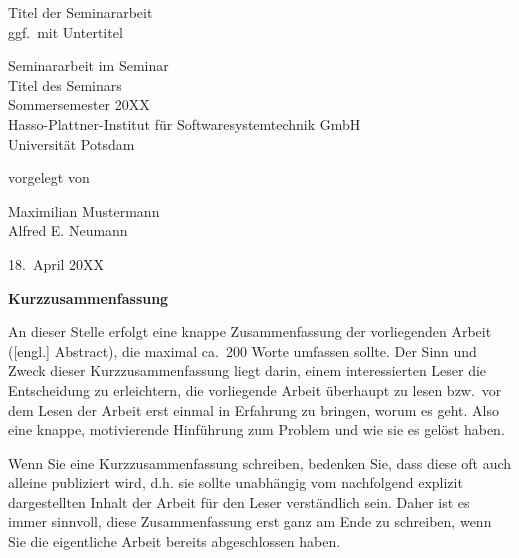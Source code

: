 \documentclass[11pt, a4paper]{article}
\begin{document}
          

\begin{titlepage}
  \begin{center} 
    \mbox{}
    \vspace{1cm}
    
    {\huge Titel der Seminararbeit \\[1em] {\LARGE ggf.~mit Untertitel}}  
        
    \vspace{5cm}
    
    Seminararbeit im Seminar \\[1em]
    {\large \sc Titel des Seminars} \\[1em]
    Sommersemester 20XX \\[1em]
    Hasso-Plattner-Institut für Softwaresystemtechnik GmbH \\[1em]
    Universität Potsdam
    
    \vspace{4cm}
    
		vorgelegt von
		
    \vspace{1em}
    
		{\Large Maximilian Mustermann} \\
		{\Large Alfred E. Neumann}
		
    \vspace{4em}
    
    18.~April 20XX
  \end{center}
\end{titlepage}


\setcounter{page}{1}

\begin{center}
{\bf Kurzzusammenfassung} 
\end{center}

\noindent
An dieser Stelle erfolgt eine knappe Zusammenfassung der vorliegenden Arbeit ([engl.] Abstract), die maximal ca.~200 Worte umfassen sollte. 
Der Sinn und Zweck dieser Kurzzusammenfassung liegt darin, einem interessierten Leser die Entscheidung zu erleichtern, die vorliegende Arbeit überhaupt zu lesen bzw.~vor dem Lesen der Arbeit erst einmal in Erfahrung zu bringen, worum es geht.
Also eine knappe, motivierende Hinführung zum Problem und wie sie es gelöst haben.

\bigskip

Wenn Sie eine Kurzzusammenfassung schreiben, bedenken Sie, dass diese oft auch alleine publiziert wird, d.h. sie sollte unabhängig vom nachfolgend explizit dargestellten Inhalt der Arbeit für den Leser verständlich sein.
Daher ist es immer sinnvoll, diese Zusammenfassung erst ganz am Ende zu schreiben, wenn Sie die eigentliche Arbeit bereits abgeschlossen haben.
\end{document}
